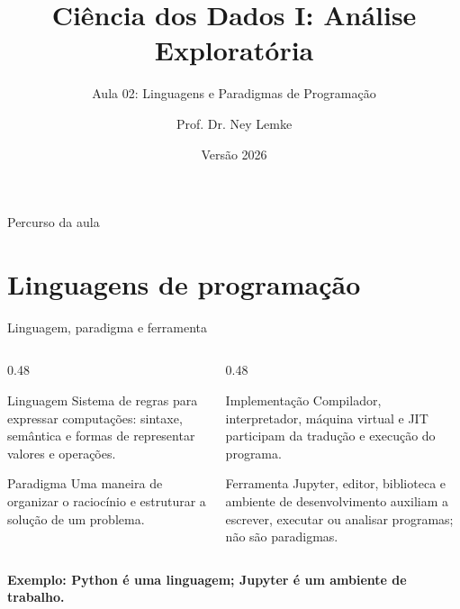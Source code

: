 \documentclass[aspectratio=169,10pt]{beamer}
\title[Aula 02 - Linguagens e Paradigmas]{Ciência dos Dados I: Análise Exploratória}
\subtitle{Aula 02: Linguagens e Paradigmas de Programação}
\author{Prof. Dr. Ney Lemke}
\institute{UNESP -- Instituto de Biociências de Botucatu}
\date{Versão 2026}
\begin{document}
\frame{\titlepage}

\begin{frame}{Percurso da aula}
  \tableofcontents
\end{frame}

\section{Linguagens de programação}

\begin{frame}{Linguagem, paradigma e ferramenta}
  \begin{columns}[T,onlytextwidth]
    \begin{column}{0.48\textwidth}
      \begin{block}{Linguagem}
        Sistema de regras para expressar computações: sintaxe, semântica e formas de representar valores e operações.
      \end{block}
      \begin{block}{Paradigma}
        Uma maneira de organizar o raciocínio e estruturar a solução de um problema.
      \end{block}
    \end{column}
    \begin{column}{0.48\textwidth}
      \begin{exampleblock}{Implementação}
        Compilador, interpretador, máquina virtual e JIT participam da tradução e execução do programa.
      \end{exampleblock}
      \begin{alertblock}{Ferramenta}
        Jupyter, editor, biblioteca e ambiente de desenvolvimento auxiliam a escrever, executar ou analisar programas; não são paradigmas.
      \end{alertblock}
    \end{column}
  \end{columns}
  \vspace{0.4em}
  \centering\textbf{Exemplo: Python é uma linguagem; Jupyter é um ambiente de trabalho.}
\end{frame}
\end{document}
